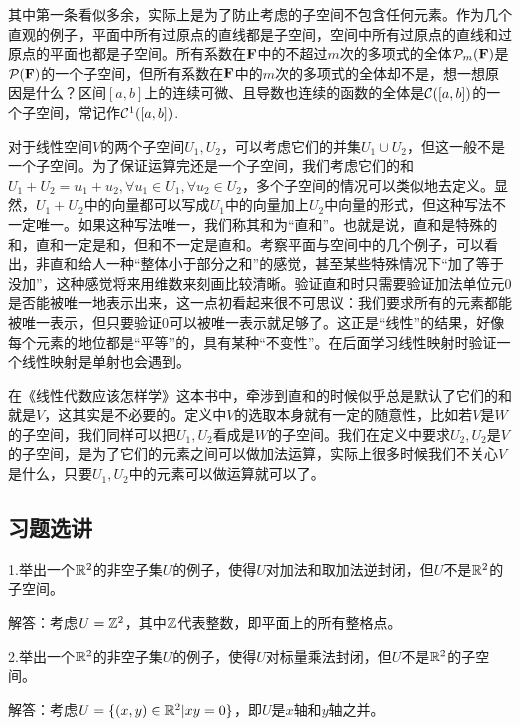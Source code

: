 \documentclass[hyperref,]{ctexart}
\begin{document}
其中第一条看似多余，实际上是为了防止考虑的子空间不包含任何元素。作为几个直观的例子，平面中所有过原点的直线都是子空间，空间中所有过原点的直线和过原点的平面也都是子空间。所有系数在\(\mathbf{F}\)中的不超过\(m\)次的多项式的全体\(\mathcal{P}_m(\mathbf{F})\)是\(\mathcal{P}(\mathbf{F})\)的一个子空间，但所有系数在\(\mathbf{F}\)中的\(m\)次的多项式的全体却不是，想一想原因是什么？区间\([a,b]\)上的连续可微、且导数也连续的函数的全体是\(\mathcal{C}([a,b])\)的一个子空间，常记作\(\mathcal{C}^1([a,b])\).

对于线性空间\(V\)的两个子空间\(U_1,U_2\)，可以考虑它们的并集\(U_1\cup U_2\)，但这一般不是一个子空间。为了保证运算完还是一个子空间，我们考虑它们的和\(U_1+U_2={u_1+u_2,\forall u_1 \in U_1,\forall u_2\in U_2}\)，多个子空间的情况可以类似地去定义。显然，\(U_1+U_2\)中的向量都可以写成\(U_1\)中的向量加上\(U_2\)中向量的形式，但这种写法不一定唯一。如果这种写法唯一，我们称其和为``直和''。也就是说，直和是特殊的和，直和一定是和，但和不一定是直和。考察平面与空间中的几个例子，可以看出，非直和给人一种``整体小于部分之和''的感觉，甚至某些特殊情况下``加了等于没加''，这种感觉将来用维数来刻画比较清晰。验证直和时只需要验证加法单位元\(0\)是否能被唯一地表示出来，这一点初看起来很不可思议：我们要求所有的元素都能被唯一表示，但只要验证\(0\)可以被唯一表示就足够了。这正是``线性''的结果，好像每个元素的地位都是``平等''的，具有某种``不变性''。在后面学习线性映射时验证一个线性映射是单射也会遇到。

在《线性代数应该怎样学》这本书中，牵涉到直和的时候似乎总是默认了它们的和就是\(V\)，这其实是不必要的。定义中\(V\)的选取本身就有一定的随意性，比如若\(V\)是\(W\)的子空间，我们同样可以把\(U_1,U_2\)看成是\(W\)的子空间。我们在定义中要求\(U_2,U_2\)是\(V\)的子空间，是为了它们的元素之间可以做加法运算，实际上很多时候我们不关心\(V\)是什么，只要\(U_1,U_2\)中的元素可以做运算就可以了。

\subsection{习题选讲}\label{ux4e60ux9898ux9009ux8bb2}

\noindent{}
1.举出一个\(\mathbb{R}^2\)的非空子集\(U\)的例子，使得\(U\)对加法和取加法逆封闭，但\(U\)不是\(\mathbb{R}^2\)的子空间。

\noindent{}
解答：考虑\(U=\mathbb{Z}^2\)，其中\(\mathbb{Z}\)代表整数，即平面上的所有整格点。

\bigskip

\noindent{}
2.举出一个\(\mathbb{R}^2\)的非空子集\(U\)的例子，使得\(U\)对标量乘法封闭，但\(U\)不是\(\mathbb{R}^2\)的子空间。

\noindent{}解答：考虑\(U=\{(x,y)\in \mathbb{R}^2|xy=0\}\)，即\(U\)是\(x\)轴和\(y\)轴之并。
\end{document}
